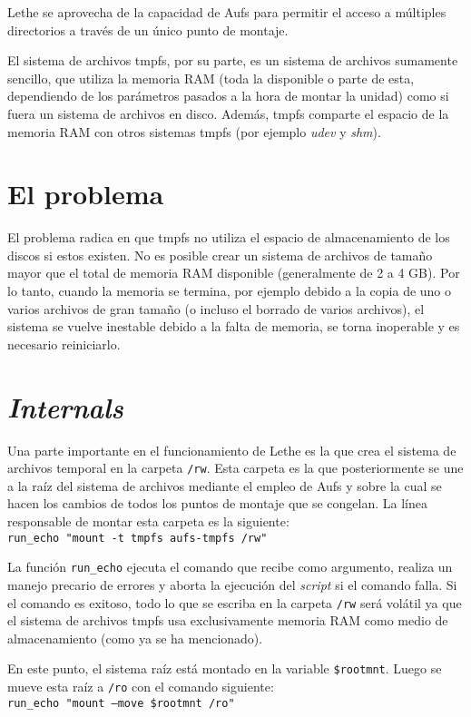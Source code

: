 \documentclass[final,narroweqnarray,inline,twoside]{ieee}
\begin{document}
Lethe se aprovecha de la capacidad de Aufs para permitir el acceso a múltiples directorios a través de un único punto de
montaje.

El sistema de archivos tmpfs, por su parte, es un sistema de archivos sumamente sencillo, que utiliza la memoria RAM (toda la
disponible o parte de esta, dependiendo de los parámetros pasados a la hora de montar la unidad) como si fuera un sistema de
archivos en disco. Además, tmpfs comparte el espacio de la memoria RAM con otros sistemas tmpfs (por ejemplo \textit{udev} y
\textit{shm}).

\section{El problema}
El problema radica en que tmpfs no utiliza el espacio de almacenamiento de los discos si estos existen. No es
posible crear un sistema de archivos de tamaño mayor que el total de memoria RAM disponible (generalmente de 2 a 4 GB). 
Por lo tanto, cuando la memoria se termina, por ejemplo debido a la copia de uno o varios archivos de gran tamaño (o incluso
el borrado de varios archivos), el sistema se vuelve inestable debido a la falta de memoria, se torna inoperable y es
necesario reiniciarlo.

\section{\textit{Internals}}
Una parte importante en el funcionamiento de Lethe es la que crea el sistema de archivos temporal en la carpeta
\texttt{/rw}. Esta carpeta es la que posteriormente se une a la raíz del sistema de archivos mediante el empleo de Aufs y
sobre la cual se hacen los cambios de todos los puntos de montaje que se congelan.
La línea responsable de montar esta carpeta es la siguiente:
\\\indent\texttt{run\_echo "mount -t tmpfs aufs-tmpfs /rw"}

La función \texttt{run\_echo} ejecuta el comando que recibe como argumento, realiza un manejo precario de errores y aborta la
ejecución del \textit{script} si el comando falla. Si el comando es exitoso, todo lo que se escriba en la carpeta
\texttt{/rw} será
volátil ya que el sistema de archivos tmpfs usa exclusivamente memoria RAM como medio de almacenamiento (como ya se
ha mencionado).

En este punto, el sistema raíz está montado en la variable \texttt{\${rootmnt}}. Luego se mueve esta raíz a \texttt{/ro}
con el comando siguiente:
\\\indent\texttt{run\_echo "mount --move \${rootmnt} /ro"}
\end{document}
